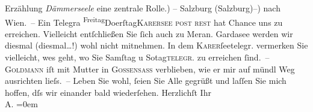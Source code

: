 \begin{ledgroupsized}[t]{13cm}
{{{                  Erzählung \emph{Dämmerseele} eine zentrale Rolle.}}}\label{K_L01702_1h}) – Salzburg (Salzburg)–) nach Wien. –\pend
           \pstart
           Ein Telegra{\geminationm}{ }\substVorne{}\textsuperscript{Freitag}{\allowbreak}\substDazwischen{}Do{\geminationn}erſtag\substHinten{}{ }\textsc{Karersee post rest} hat Chance uns zu
               erreichen. Vielleicht entſchließen Sie ſich auch zu Meran. Gardasee werden wir diesmal
                  (diesmal{\dots}!) wohl nicht mitnehmen. In dem \textsc{Karer}ſeetelegr. vermerken Sie vielleicht, we{\geminationn}s geht, wo Sie Samſtag{ }{\pb}u So{\geminationn}tag\textsc{telegr.} zu erreichen ſind. –\pend
           \pstart
           \textsc{Goldmann} iſt mit Mutter in \textsc{Gossensass} verblieben, wie er mir auf mündl Weg ausrichten lieſs. –\pend
           \pstart
           Leben Sie wohl, ſeien Sie Alle gegrüßt und laſſen Sie mich hoffen, dſs wir einander
               bald wiederſehen.\pend
           \pstart
           Herzlichſt Ihr{\\[\baselineskip]}\spacefill\mbox{A.}\pend
           \leftskip=0em{}          \endnumbering{}\end{ledgroupsized}  \newcommand{\dateiname}{L01702}\newcommand{\titel}{Arthur Schnitzler an Richard Beer-Hofmann, 25. 8. 1907}\newcommand{\editorInnen}{Martin Anton Müller und Gerd-Hermann Susen}
            \footnotesize
\begin{ledgroupsized}[t]{11.5cm}
\end{ledgroupsized}
         
      